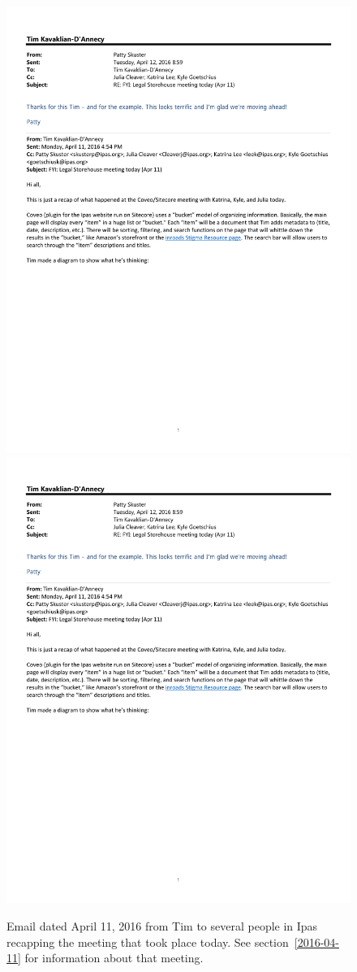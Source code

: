 \begin{figure}
   \centering
       \noindent\includegraphics[page=1,width=.45\textwidth]{documents/2016-04-11-Email-Tim.pdf} \hfill 
       \noindent\includegraphics[page=2,width=.45\textwidth]{documents/2016-04-11-Email-Tim.pdf}
 \caption{Email dated April 11, 2016 from Tim to several people in Ipas recapping the meeting that took place today. See section~\protect\ref{2016-04-11} for information about that meeting.}
 \label{fig:2016-04-11-Email-Tim}
\end{figure}

